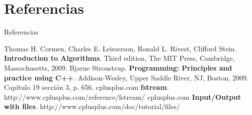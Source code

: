 \documentclass[aspectratio=169]{beamer}
\begin{document}
\section{Referencias}
\begin{frame}{Referencias}
\begin{thebibliography}{9}
Thomas H. Cormen, Charles E. Leirserson, Ronald L. Rivest, Clifford Stein.
\textbf{Introduction to Algorithms}.
Third edition, The MIT Press, Cambridge, Massachusetts, 2009.
Bjarne Stroustrup.
\textbf{Programming: Principles and practice using C++}.
Addison-Wesley, Upper Saddle River, NJ, Boston, 2009. Capítulo 19 sección 3, p. 656.
cplusplus.com
\textbf{fstream}. http://www.cplusplus.com/reference/fstream/
cplusplus.com
\textbf{Input/Output with files}. http://www.cplusplus.com/doc/tutorial/files/
\end{thebibliography}
\end{frame}
\end{document}
